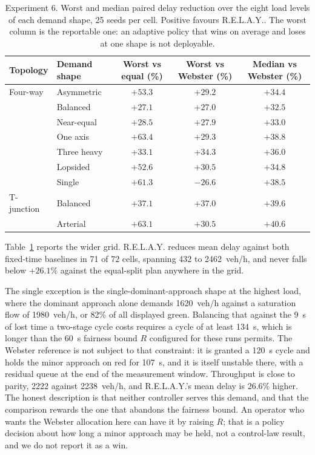 \documentclass[journal]{IEEEtran}
\newcommand{\relay}{R.E.L.A.Y.}
\begin{document}
\begin{table}[t]
\centering
\caption{Experiment 6. Worst and median paired delay reduction over the eight load levels of each
demand shape, 25 seeds per cell. Positive favours \relay. The worst column is the reportable one:
an adaptive policy that wins on average and loses at one shape is not deployable.}
\label{tab:exp6}
\small
\begin{tabular}{llccc}
\toprule
Topology & Demand shape & Worst vs equal (\%) & Worst vs Webster (\%) & Median vs Webster (\%) \\
\midrule
Four-way & Asymmetric   & $+53.3$ & $+29.2$ & $+34.4$ \\
         & Balanced     & $+27.1$ & $+27.0$ & $+32.5$ \\
         & Near-equal   & $+28.5$ & $+27.9$ & $+33.0$ \\
         & One axis     & $+63.4$ & $+29.3$ & $+38.8$ \\
         & Three heavy  & $+33.1$ & $+34.3$ & $+36.0$ \\
         & Lopsided     & $+52.6$ & $+30.5$ & $+34.8$ \\
         & Single       & $+61.3$ & $-26.6$ & $+38.5$ \\
\midrule
T-junction & Balanced   & $+37.1$ & $+37.0$ & $+39.6$ \\
           & Arterial   & $+63.1$ & $+30.5$ & $+40.6$ \\
\bottomrule
\end{tabular}
\end{table}

Table~\ref{tab:exp6} reports the wider grid. \relay{} reduces mean delay against both fixed-time
baselines in 71 of 72 cells, spanning 432 to 2462~veh/h, and never falls below $+26.1\%$ against the
equal-split plan anywhere in the grid.

The single exception is the single-dominant-approach shape at the highest load, where the dominant
approach alone demands 1620~veh/h against a saturation flow of 1980~veh/h, or 82\% of all displayed
green. Balancing that against the 9~s of lost time a two-stage cycle costs requires a cycle of at
least 134~s, which is longer than the 60~s fairness bound $R$ configured for these runs permits. The
Webster reference is not subject to that constraint: it is granted a 120~s cycle and holds the minor
approach on red for 107~s, and it is itself unstable there, with a residual queue at the end of the
measurement window. Throughput is close to parity, 2222 against 2238~veh/h, and \relay's mean delay is
26.6\% higher. The honest description is that neither controller serves this demand, and that the
comparison rewards the one that abandons the fairness bound. An operator who
wants the Webster allocation here can have it by raising $R$; that is a policy decision about how long
a minor approach may be held, not a control-law result, and we do not report it as a win.
\end{document}

